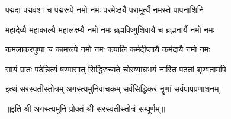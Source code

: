 \twolineshloka
{पद्मदा पद्मवंशा च पद्मरूपे नमो नमः}
{परमेष्ठ्यै परामूर्त्यै नमस्ते पापनाशिनि}

\twolineshloka
{महादेव्यै महाकाल्यै महालक्ष्म्यै नमो नमः}
{ब्रह्मविष्णुशिवायै च ब्रह्मनार्यै नमो नमः}

\twolineshloka
{कमलाकरपुष्पा च कामरूपे नमो नमः}
{कपालि कर्मदीप्तायै कर्मदायै नमो नमः}

\twolineshloka
{सायं प्रातः पठेन्नित्यं षण्मासात् सिद्धिरुच्यते}
{चोरव्याघ्रभयं नास्ति पठतां शृण्वतामपि}

\twolineshloka
{इत्थं सरस्वतीस्तोत्रम् अगस्त्यमुनिवाचकम्}
{सर्वसिद्धिकरं नॄणां सर्वपापप्रणाशनम्}

॥इति श्री-अगस्त्यमुनि-प्रोक्तं श्री-सरस्वतीस्तोत्रं सम्पूर्णम्॥